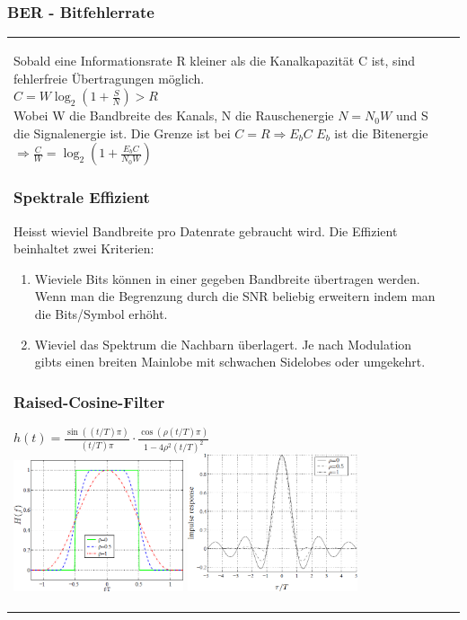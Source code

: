 \subsubsection{BER - Bitfehlerrate }
\begin{tabular}{ll}
	\parbox{10.5cm}{
	Sobald eine Informationsrate R kleiner als die Kanalkapazität C ist, sind
	fehlerfreie Übertragungen möglich.\\
	$C= W \log_2 ( 1+\frac{S}{N}) > R$\\
	Wobei W die Bandbreite des Kanals, N die Rauschenergie $N=N_0 W$ und S die
	Signalenergie ist.
	Die Grenze ist bei $C=R \Longrightarrow E_b C$ $E_b$ ist die Bitenergie\\

	$\Longrightarrow \frac{C}{W}= \log_2(1+\frac{E_b C}{N_0 W})$\\ 

	
	\subsubsection{Spektrale Effizient }
	Heisst wieviel Bandbreite pro Datenrate gebraucht wird.
	Die Effizient beinhaltet zwei Kriterien:
	\begin{enumerate}
	\item Wieviele Bits können in einer gegeben Bandbreite übertragen werden. Wenn
	man die Begrenzung durch die SNR beliebig erweitern indem man die Bits/Symbol
	erhöht.
	\item Wieviel das Spektrum die Nachbarn überlagert. Je nach Modulation gibts
	einen breiten Mainlobe mit schwachen Sidelobes oder umgekehrt.
    \end{enumerate}
  
    \subsubsection{Raised-Cosine-Filter }
    $h(t) = \frac{\sin\left((t/T)\pi\right)}{(t/T)\pi}\cdot
        \frac{\cos\left(\rho(t/T)\pi\right)}{1-4\rho^2(t/T)^2}$\\
   
    \includegraphics[width=5cm]{./bilder/modulation_raised_cosine_frequency.png}
    \includegraphics[width=5cm]{./bilder/modulation_raised_cosine_time.png} 
    
}
\end{tabular}
